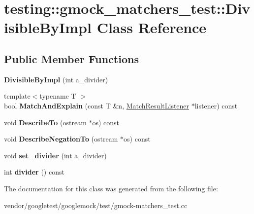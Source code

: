 \hypertarget{classtesting_1_1gmock__matchers__test_1_1_divisible_by_impl}{}\section{testing\+:\+:gmock\+\_\+matchers\+\_\+test\+:\+:Divisible\+By\+Impl Class Reference}
\label{classtesting_1_1gmock__matchers__test_1_1_divisible_by_impl}
\subsection*{Public Member Functions}
\begin{DoxyCompactItemize}
\item 
\mbox{\label{classtesting_1_1gmock__matchers__test_1_1_divisible_by_impl_aab5d8d383a8cbf112fe087c4f0f3f699}} 
{\bfseries Divisible\+By\+Impl} (int a\+\_\+divider)
\item 
\mbox{\label{classtesting_1_1gmock__matchers__test_1_1_divisible_by_impl_a2621df4b34315b327e20b6f4d901417d}} 
{\footnotesize template$<$typename T $>$ }\\bool {\bfseries Match\+And\+Explain} (const T \&n, \mbox{\hyperlink{classtesting_1_1_match_result_listener}{Match\+Result\+Listener}} $\ast$listener) const
\item 
\mbox{\label{classtesting_1_1gmock__matchers__test_1_1_divisible_by_impl_aabd14d5f96ef6851141d9ed9fbee3f86}} 
void {\bfseries Describe\+To} (ostream $\ast$os) const
\item 
\mbox{\label{classtesting_1_1gmock__matchers__test_1_1_divisible_by_impl_a9c061ef411c126c604d4c33d92911d50}} 
void {\bfseries Describe\+Negation\+To} (ostream $\ast$os) const
\item 
\mbox{\label{classtesting_1_1gmock__matchers__test_1_1_divisible_by_impl_a86c8787ab835bc84a9ad7e3931d644cc}} 
void {\bfseries set\+\_\+divider} (int a\+\_\+divider)
\item 
\mbox{\label{classtesting_1_1gmock__matchers__test_1_1_divisible_by_impl_afaf102bc25623966dd11805b62e42321}} 
int {\bfseries divider} () const
\end{DoxyCompactItemize}


The documentation for this class was generated from the following file\+:\begin{DoxyCompactItemize}
\item 
vendor/googletest/googlemock/test/gmock-\/matchers\+\_\+test.\+cc\end{DoxyCompactItemize}
